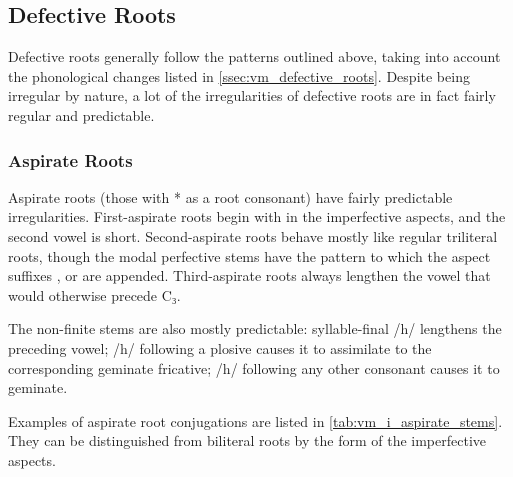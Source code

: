 \documentclass[grammar]{subfiles}
\begin{document}
\subsection{Defective Roots}
\label{ssec:vm_i_defective}

Defective roots generally follow the patterns outlined above, taking into
account the phonological changes listed in \cref{ssec:vm_defective_roots}.
Despite being irregular by nature, a lot of the irregularities of defective
roots are in fact fairly regular and predictable. 


\subsubsection{Aspirate Roots}
\label{sssec:vm_i_aspirate}

Aspirate roots (those with * as a root consonant) have fairly predictable
irregularities.  First-aspirate roots begin with  in the imperfective
aspects, and the second vowel is short.  Second-aspirate roots behave mostly like
regular triliteral roots, though the modal perfective stems have the pattern
 to which the aspect suffixes ,  or  are appended.
Third-aspirate roots always lengthen the vowel that would otherwise precede C₃.  

The non-finite stems are also mostly predictable: syllable-final /h/ lengthens the
preceding vowel; /h/ following a plosive causes it to assimilate to the
corresponding geminate fricative; /h/ following any other consonant causes it
to geminate. 

Examples of aspirate root conjugations are listed in
\cref{tab:vm_i_aspirate_stems}.  They can be distinguished from biliteral roots
by the form of the imperfective aspects. 
\end{document}
